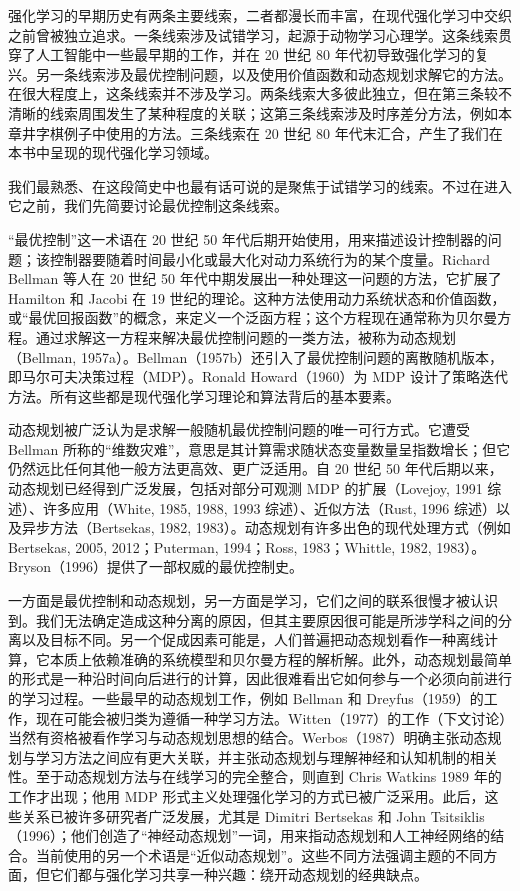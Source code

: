 \documentclass[UTF8,12pt,a4paper,fontset=fandol]{ctexart}
\begin{document}
强化学习的早期历史有两条主要线索，二者都漫长而丰富，在现代强化学习中交织之前曾被独立追求。一条线索涉及试错学习，起源于动物学习心理学。这条线索贯穿了人工智能中一些最早期的工作，并在 20 世纪 80 年代初导致强化学习的复兴。另一条线索涉及最优控制问题，以及使用价值函数和动态规划求解它的方法。在很大程度上，这条线索并不涉及学习。两条线索大多彼此独立，但在第三条较不清晰的线索周围发生了某种程度的关联；这第三条线索涉及时序差分方法，例如本章井字棋例子中使用的方法。三条线索在 20 世纪 80 年代末汇合，产生了我们在本书中呈现的现代强化学习领域。

我们最熟悉、在这段简史中也最有话可说的是聚焦于试错学习的线索。不过在进入它之前，我们先简要讨论最优控制这条线索。

“最优控制”这一术语在 20 世纪 50 年代后期开始使用，用来描述设计控制器的问题；该控制器要随着时间最小化或最大化对动力系统行为的某个度量。Richard Bellman 等人在 20 世纪 50 年代中期发展出一种处理这一问题的方法，它扩展了 Hamilton 和 Jacobi 在 19 世纪的理论。这种方法使用动力系统状态和价值函数，或“最优回报函数”的概念，来定义一个泛函方程；这个方程现在通常称为贝尔曼方程。通过求解这一方程来解决最优控制问题的一类方法，被称为动态规划（Bellman, 1957a）。Bellman（1957b）还引入了最优控制问题的离散随机版本，即马尔可夫决策过程（MDP）。Ronald Howard（1960）为 MDP 设计了策略迭代方法。所有这些都是现代强化学习理论和算法背后的基本要素。

动态规划被广泛认为是求解一般随机最优控制问题的唯一可行方式。它遭受 Bellman 所称的“维数灾难”，意思是其计算需求随状态变量数量呈指数增长；但它仍然远比任何其他一般方法更高效、更广泛适用。自 20 世纪 50 年代后期以来，动态规划已经得到广泛发展，包括对部分可观测 MDP 的扩展（Lovejoy, 1991 综述）、许多应用（White, 1985, 1988, 1993 综述）、近似方法（Rust, 1996 综述）以及异步方法（Bertsekas, 1982, 1983）。动态规划有许多出色的现代处理方式（例如 Bertsekas, 2005, 2012；Puterman, 1994；Ross, 1983；Whittle, 1982, 1983）。Bryson（1996）提供了一部权威的最优控制史。

一方面是最优控制和动态规划，另一方面是学习，它们之间的联系很慢才被认识到。我们无法确定造成这种分离的原因，但其主要原因很可能是所涉学科之间的分离以及目标不同。另一个促成因素可能是，人们普遍把动态规划看作一种离线计算，它本质上依赖准确的系统模型和贝尔曼方程的解析解。此外，动态规划最简单的形式是一种沿时间向后进行的计算，因此很难看出它如何参与一个必须向前进行的学习过程。一些最早的动态规划工作，例如 Bellman 和 Dreyfus（1959）的工作，现在可能会被归类为遵循一种学习方法。Witten（1977）的工作（下文讨论）当然有资格被看作学习与动态规划思想的结合。Werbos（1987）明确主张动态规划与学习方法之间应有更大关联，并主张动态规划与理解神经和认知机制的相关性。至于动态规划方法与在线学习的完全整合，则直到 Chris Watkins 1989 年的工作才出现；他用 MDP 形式主义处理强化学习的方式已被广泛采用。此后，这些关系已被许多研究者广泛发展，尤其是 Dimitri Bertsekas 和 John Tsitsiklis（1996）；他们创造了“神经动态规划”一词，用来指动态规划和人工神经网络的结合。当前使用的另一个术语是“近似动态规划”。这些不同方法强调主题的不同方面，但它们都与强化学习共享一种兴趣：绕开动态规划的经典缺点。
\end{document}

